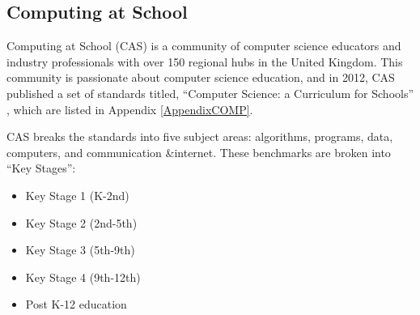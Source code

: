 \subsection{Computing at School}
Computing at School (CAS) is a community of computer science educators and industry professionals with over 150 regional hubs in the United Kingdom. This community is passionate about computer science education, and in 2012, CAS published a set of standards titled, ``Computer Science: a Curriculum for Schools'' \cite{computas}, which are listed in Appendix \ref{AppendixCOMP}.\par 
CAS breaks the standards into five subject areas: algorithms, programs, data, computers, and communication \&internet. These benchmarks are broken into ``Key Stages'':
\begin{itemize}
	\item Key Stage 1 (K-2nd)
	\item Key Stage 2 (2nd-5th)
	\item Key Stage 3 (5th-9th)
	\item Key Stage 4 (9th-12th)
	\item Post K-12 education
\end{itemize}

